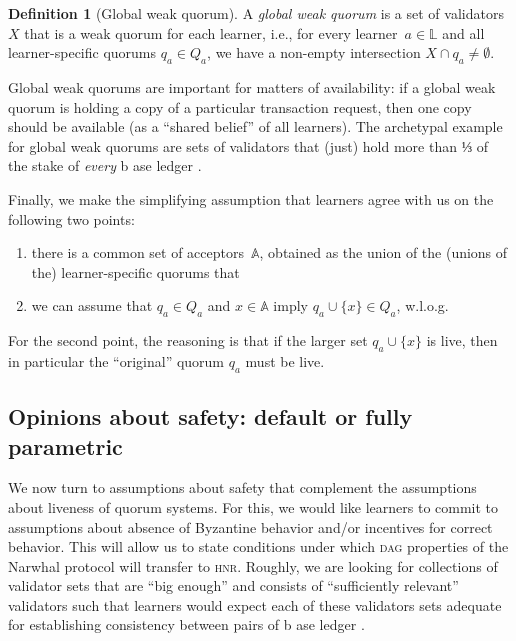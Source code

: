 \documentclass[%
dvipsnames
]{article}
\theoremstyle{definition}
\newtheorem{definition}{Definition}
\newcommand{\base}[1][ ]{%
  b\ase[#1]%
}
\newcommand{\ase}[1][ ]{%
  ase ledger%
  \ifthenelse{\equal{#1}{ }}{}{#1}\xspace%
}
\newcommand{\Dag}[1][]{\textsc{dag}#1\xspace}
\newcommand{\hnr}{\textsc{hnr}\xspace}
\newcommand{\Q}[1]{%
  Q_{#1}%
}
\newcommand{\q}[2][]{%
  q#1_{#2}%
}
\let\oldendnote\endnote
\renewcommand{\endnote}[2][ ]{%
  \ifthenelse{\equal{#1}{ }}%
  {\marginnote{\oldendnote{#2}}}%
  {\marginnote{\oldendnote[#1]{#2}}}%
}
\renewcommand{\todo}[2][]{}
\renewcommand{\endnote}[2][]{}
\newcounter{old\v,\r}\setcounter{old\v,\r}{0}%
\begin{document}
\begin{definition}[Global weak quorum]
  \label{def:global-weak-quorum}
  A \emph{global weak quorum} is %
  a set of validators \(X\) that is a weak quorum for each learner, %
  i.e., 
  for every learner~\(a ∈ 𝕃\) and %
  all learner-specific quorums \(\q{a} ∈ \Q{a}\), %
  we have a non-empty intersection \(X ∩ \q{a} ≠ ∅\). %
\end{definition}
Global weak quorums are important for matters of availability:
if a global weak quorum is holding a copy of a particular transaction request, %
then one copy should be available %
(as a “shared belief” of all learners). %
The archetypal example for global weak quorums are sets of validators that 
(just) hold more than ⅓ of the stake of \emph{every} \base. %

Finally, %
we make the simplifying assumption %
that learners agree with us on the following two points:
\begin{enumerate}
\item there is a common set of acceptors \(𝔸\),
  obtained as the union of the (unions of the) learner-specific quorums that  
\item 
  we can assume that %
  \(\q{a} ∈ \Q{a}\) and \(x ∈ 𝔸\) %
  imply \(\q{a} \cup \{x\} ∈ \Q{a}\), w.l.o.g. %
\end{enumerate}
For the second point, %
the reasoning is that if the larger set \(\q{a} \cup \{x\}\) is live, %
then in particular the “original” quorum \(\q{a}\) must be live. %
\endnote{%
  Probably we don't need universal quorums. %
  \begin{minipage}[t][\arraycolsep][t]{1.0\linewidth}
    \begin{definition}[Universal Quorum]
      \label{def:universal-quorum}
      A \emph{universal quorum} is a set of quorums
      that contains at least one learner-specific quorum for each learner.
    \end{definition}
  \end{minipage}
  Or, do we?
}



\subsection{Opinions about safety: default or fully parametric}
\label{sec:asymmetric-safety}
We now turn to assumptions about safety that %
complement the assumptions about liveness of quorum systems. %
For this, %
we would like learners to commit to assumptions about %
absence of Byzantine behavior and/or incentives for correct behavior. %
This will allow us to state conditions under which %
\Dag properties of the Narwhal protocol will transfer to \hnr. %
Roughly, %
we are looking for collections of validator sets %
that are “big enough” and consists of %
“sufficiently relevant” validators %
such that learners would expect each of these validators sets %
adequate for establishing consistency between pairs of \base[s]. %
\todo{boy, is it hard to get these intuitions communicated }
\end{document}
